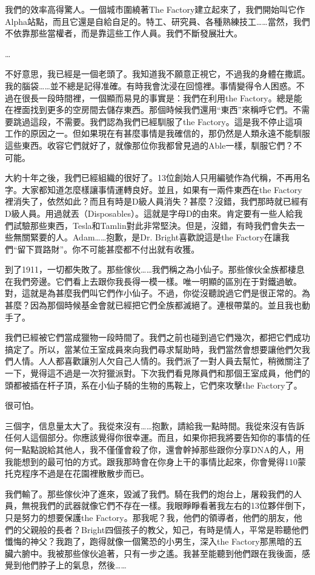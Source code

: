 我們的效率高得驚人。一個城市圍繞著The Factory建立起來了，我們開始叫它作Alpha站點，而且它還是自給自足的。特工、研究員、各種熟練技工……當然，我們不依靠那些當權者，而是靠這些工作人員。我們不斷發展壯大。

…

不好意思，我已經是一個老頭了。我知道我不願意正視它，不過我的身體在撒謊。我的腦袋……並不總是記得准確。有時我會沈浸在回憶裡。事情變得令人困惑。不過在很長一段時間裡，一個顯而易見的事實是：我們在利用the Factory。總是能在裡面找到更多的空房間去儲存東西。那個時候我們還用“東西”來稱呼它們。不需要跳過這段，不需要。我們認為我們已經馴服了the Factory。這是我不停止這項工作的原因之一。但如果現在有甚麼事情是我確信的，那仍然是人類永遠不能馴服這些東西。收容它們就好了，就像那位你我都曾見過的Able一樣，馴服它們？不可能。

大約十年之後，我們已經組織的很好了。13位創始人只用編號作為代稱，不再用名字。大家都知道怎麼樣讓事情運轉良好。並且，如果有一兩件東西在the Factory裡消失了，依然如此？而且有時是D級人員消失？甚麼？沒錯，我們那時就已經有D級人員。用過就丟（Disposables）。這就是字母D的由來。肯定要有一些人給我們試驗那些東西，Tesla和Tamlin對此非常堅決。但是，沒錯，有時我們會失去一些無關緊要的人。Adam……抱歉，是Dr. Bright喜歡說這是the Factory在讓我們“留下買路財”。你不可能甚麼都不付出就有收獲。

到了1911，一切都失敗了。那些傢伙……我們稱之為小仙子。那些傢伙全族都棲息在我們旁邊。它們看上去跟你我長得一模一樣。唯一明顯的區別在于對鐵過敏。對，這就是為甚麼我們叫它們作小仙子。不過，你從沒聽說過它們是很正常的。為甚麼？因為那個時候基金會就已經把它們全族都滅絕了。連根帶葉的。並且我也動手了。

我們已經被它們當成獵物一段時間了。我們之前也碰到過它們幾次，都把它們成功搞定了。所以，當某位王室成員來向我們尋求幫助時，我們當然會想要讓他們欠我們人情。人人都喜歡讓別人欠自己人情的。我們派了一對人員去幫忙，稍微關注了一下，覺得這不過是一次狩獵派對。下次我們看見隊員們和那個王室成員，他們的頭都被插在杆子頂，系在小仙子騎的生物的馬鞍上，它們來攻擊the Factory了。

很可怕。

三個字，信息量太大了。我從來沒有……抱歉，請給我一點時間。我從來沒有告訴任何人這個部分。你應該覺得你很幸運。而且，如果你把我將要告知你的事情的任何一點點說給其他人，我不僅僅會殺了你，還會幹掉那些跟你分享DNA的人，用我能想到的最可怕的方式。跟我那時會在你身上干的事情比起來，你會覺得110蒙托克程序不過是在花園裡散散步而已。

我們輸了。那些傢伙沖了進來，毀滅了我們。騎在我們的炮台上，屠殺我們的人員，無視我們的武器就像它們不存在一樣。我眼睜睜看著我左右的13位夥伴倒下，只是努力的想要保護the Factory。那我呢？我，他們的領導者，他們的朋友，他們的父親般的長者？Bright四個孩子的教父，知己，有時是情人，平常是聆聽他們懺悔的神父？我跑了，跑得就像一個驚恐的小男生，深入the Factory那黑暗的五臟六腑中。我被那些傢伙追著，只有一步之遙。我甚至能聽到他們跟在我後面，感覺到他們脖子上的氣息，然後……

